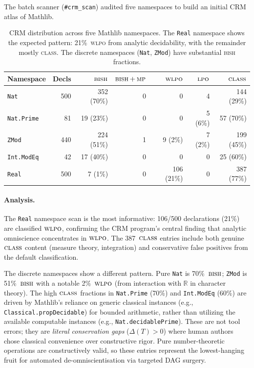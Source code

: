 \documentclass[12pt, a4paper]{article}
\theoremstyle{plain}
\theoremstyle{definition}
\theoremstyle{remark}
\newcommand{\BISH}{\textsc{bish}}
\newcommand{\BISHMP}{\textsc{bish\,+\,mp}}
\newcommand{\WLPO}{\textsc{wlpo}}
\newcommand{\LPO}{\textsc{lpo}}
\newcommand{\CLASS}{\textsc{class}}
\begin{document}
The batch scanner (\texttt{\#crm\_scan}) audited five namespaces
to build an initial CRM atlas of Mathlib.

\begin{table}[h]
\centering
\begin{tabular}{lrrrrrr}
\toprule
Namespace & Decls & $\BISH$ & $\BISHMP$ & $\WLPO$ & $\LPO$ & $\CLASS$ \\
\midrule
\texttt{Nat}        & 500 & 352 (70\%) & 0 & 0 & 4 & 144 (29\%) \\
\texttt{Nat.Prime}  & 81  & 19 (23\%) & 0 & 0 & 5 (6\%) & 57 (70\%) \\
\texttt{ZMod}       & 440 & 224 (51\%) & 1 & 9 (2\%) & 7 (2\%) & 199 (45\%) \\
\texttt{Int.ModEq}  & 42  & 17 (40\%) & 0 & 0 & 0 & 25 (60\%) \\
\texttt{Real}       & 500 & 7 (1\%) & 0 & 106 (21\%) & 0 & 387 (77\%) \\
\bottomrule
\end{tabular}
\caption{CRM distribution across five Mathlib namespaces.  The
\texttt{Real} namespace shows the expected pattern: 21\%~\WLPO{}
from analytic decidability, with the remainder mostly \CLASS.
The discrete namespaces (\texttt{Nat}, \texttt{ZMod}) have
substantial \BISH{} fractions.}
\label{tab:namespace-scans}
\end{table}

\paragraph{Analysis.}
The \texttt{Real} namespace scan is the most informative:
106/500 declarations (21\%) are classified $\WLPO$, confirming
the CRM program's central finding that analytic omniscience
concentrates in $\WLPO$.  The 387~$\CLASS$ entries include both
genuine $\CLASS$ content (measure theory, integration) and
conservative false positives from the default classification.

The discrete namespaces show a different pattern.  Pure
\texttt{Nat} is 70\%~$\BISH$; \texttt{ZMod} is 51\%~$\BISH$
with a notable 2\%~$\WLPO$ (from interaction with $\mathbb{R}$
in character theory).  The high $\CLASS$ fractions in
\texttt{Nat.Prime} (70\%) and \texttt{Int.ModEq} (60\%) are
driven by Mathlib's reliance on generic classical instances
(e.g., \texttt{Classical.propDecidable}) for bounded arithmetic,
rather than utilizing the available computable instances (e.g.,
\texttt{Nat.decidablePrime}).  These are not tool errors; they
are \emph{literal conservation gaps} ($\Delta(T) > 0$) where
human authors chose classical convenience over constructive rigor.
Pure number-theoretic operations are constructively valid, so
these entries represent the lowest-hanging fruit for automated
de-omniscientisation via targeted DAG surgery.
\end{document}
